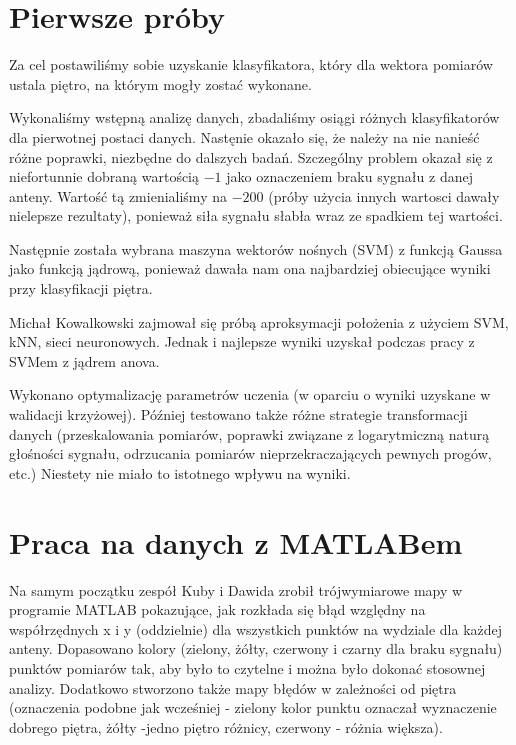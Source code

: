 \documentclass{article}
\begin{document}
\section{Pierwsze próby}
Za cel postawiliśmy sobie uzyskanie klasyfikatora, który dla wektora pomiarów ustala piętro, na którym mogły zostać wykonane.

Wykonaliśmy wstępną analizę danych, zbadaliśmy osiągi różnych klasyfikatorów dla pierwotnej postaci danych. Nastęnie okazało się, że należy na nie nanieść różne poprawki, niezbędne do dalszych badań. Szczególny problem okazał się z niefortunnie dobraną wartością $-1$ jako oznaczeniem braku sygnału z danej anteny. Wartość tą zmienialiśmy na $-200$ (próby użycia innych wartosci dawały nielepsze rezultaty), ponieważ siła sygnału słabła wraz ze spadkiem tej wartości.

Następnie została wybrana maszyna wektorów nośnych (SVM) z funkcją Gaussa jako funkcją jądrową, ponieważ dawała nam ona najbardziej obiecujące wyniki przy klasyfikacji piętra.

Michał Kowalkowski zajmował się próbą aproksymacji położenia z użyciem SVM, kNN, sieci neuronowych. Jednak i najlepsze wyniki uzyskał podczas pracy z SVMem z jądrem anova.

Wykonano optymalizację parametrów uczenia (w oparciu o wyniki uzyskane w walidacji krzyżowej). Później testowano także różne strategie transformacji danych (przeskalowania pomiarów, poprawki związane z logarytmiczną naturą głośności sygnału, odrzucania pomiarów nieprzekraczających pewnych progów, etc.)  Niestety nie miało to istotnego wpływu na wyniki.

\section{Praca na danych z MATLABem}

Na samym początku zespół Kuby i Dawida zrobił trójwymiarowe mapy w programie MATLAB pokazujące, jak rozkłada się błąd względny na współrzędnych x i y (oddzielnie) dla wszystkich punktów na wydziale dla każdej anteny. Dopasowano kolory (zielony, żółty, czerwony i czarny dla braku sygnału) punktów pomiarów tak, aby było to czytelne i można było dokonać stosownej analizy.
Dodatkowo stworzono także mapy błędów w zależności od piętra (oznaczenia podobne jak wcześniej - zielony kolor punktu oznaczał wyznaczenie dobrego piętra, żółty -jedno piętro różnicy, czerwony - różnia większa).\\
\end{document}
